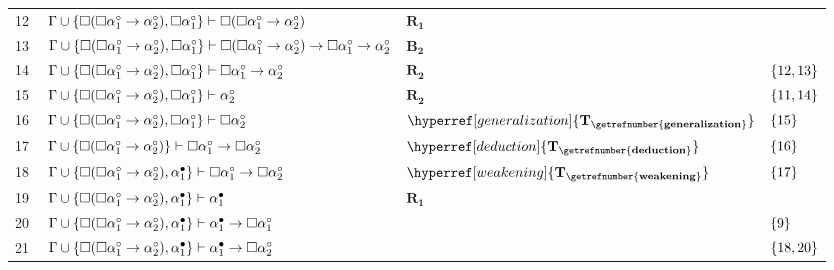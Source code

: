 \begin{tcolorbox}[enhanced jigsaw, breakable, sharp corners, colframe=black, colback=white, boxrule=0.5pt, left=1.5mm, right=1.5mm, top=1.5mm, bottom=1.5mm]
\begin{xltabular}{\textwidth}{r | X l l}
            \scriptsize{12}\phantom{ } & $\ \Gamma \cup \left\{\Box(\Box\alpha_1^\circ \to \alpha_2^\circ), \Box\alpha_1^\circ\right\} \vdash \Box(\Box\alpha_1^\circ \to \alpha_2^\circ)$ & $\hyperref[modal.rule.1]{\mathbf{R_1}}$ & \\[\rowskip]
            \scriptsize{13}\phantom{ } & $\ \Gamma \cup \left\{\Box(\Box\alpha_1^\circ \to \alpha_2^\circ), \Box\alpha_1^\circ\right\} \vdash \Box(\Box\alpha_1^\circ \to \alpha_2^\circ) \to \Box\alpha_1^\circ \to \alpha_2^\circ$ & $\hyperref[modal.axiom.modal.2]{\mathbf{B_2}}$ & \\[\rowskip]
            \scriptsize{14}\phantom{ } & $\ \Gamma \cup \left\{\Box(\Box\alpha_1^\circ \to \alpha_2^\circ), \Box\alpha_1^\circ\right\} \vdash \Box\alpha_1^\circ \to \alpha_2^\circ$ & $\hyperref[modal.rule.2]{\mathbf{R_2}}$ & $\left\{12,13\right\}$\\[\rowskip]
            \scriptsize{15}\phantom{ } & $\ \Gamma \cup \left\{\Box(\Box\alpha_1^\circ \to \alpha_2^\circ), \Box\alpha_1^\circ\right\} \vdash \alpha_2^\circ$ & $\hyperref[modal.rule.2]{\mathbf{R_2}}$ & $\left\{11,14\right\}$\\[\rowskip]
            \scriptsize{16}\phantom{ } & $\ \Gamma \cup \left\{\Box(\Box\alpha_1^\circ \to \alpha_2^\circ), \Box\alpha_1^\circ\right\} \vdash \Box\alpha_2^\circ$ & $\hyperref[generalization]{\mathbf{T_{\getrefnumber{generalization}}}}$ & $\left\{15\right\}$\\[\rowskip]
            \scriptsize{17}\phantom{ } & $\ \Gamma \cup \left\{\Box(\Box\alpha_1^\circ \to \alpha_2^\circ)\right\} \vdash \Box\alpha_1^\circ \to \Box\alpha_2^\circ$ & $\hyperref[deduction]{\mathbf{T_{\getrefnumber{deduction}}}}$ & $\left\{16\right\}$\\[\rowskip]
            \scriptsize{18}\phantom{ } & $\ \Gamma \cup \left\{\Box(\Box\alpha_1^\circ \to \alpha_2^\circ), \alpha_1^\bullet\right\} \vdash \Box\alpha_1^\circ \to \Box\alpha_2^\circ$ & $\hyperref[weakening]{\mathbf{T_{\getrefnumber{weakening}}}}$ & $\left\{17\right\}$\\[\rowskip]
            \scriptsize{19}\phantom{ } & $\ \Gamma \cup \left\{\Box(\Box\alpha_1^\circ \to \alpha_2^\circ), \alpha_1^\bullet\right\} \vdash \alpha_1^\bullet$ & $\hyperref[modal.rule.1]{\mathbf{R_1}}$ & \\[\rowskip]
            \scriptsize{20}\phantom{ } & $\ \Gamma \cup \left\{\Box(\Box\alpha_1^\circ \to \alpha_2^\circ), \alpha_1^\bullet\right\} \vdash \alpha_1^\bullet \to \Box\alpha_1^\circ$ &  & $\left\{9\right\}$\\[\rowskip]
            \scriptsize{21}\phantom{ } & $\ \Gamma \cup \left\{\Box(\Box\alpha_1^\circ \to \alpha_2^\circ), \alpha_1^\bullet\right\} \vdash \alpha_1^\bullet \to \Box\alpha_2^\circ$ &  & $\left\{18,20\right\}$\\[\rowskip]

\end{xltabular}
\end{tcolorbox}
